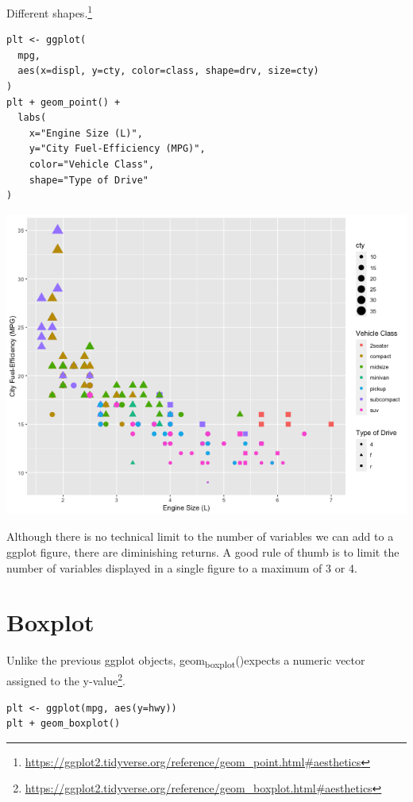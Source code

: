 \documentclass[11pt]{article}
\begin{document}
Different shapes.\footnote{\url{https://ggplot2.tidyverse.org/reference/geom\_point.html\#aesthetics}}

\begin{verbatim}
plt <- ggplot(
  mpg,
  aes(x=displ, y=cty, color=class, shape=drv, size=cty)
)
plt + geom_point() +
  labs(
    x="Engine Size (L)",
    y="City Fuel-Efficiency (MPG)",
    color="Vehicle Class",
    shape="Type of Drive"
)
\end{verbatim}

\begin{org}
\begin{center}
\includegraphics[width=.9\linewidth]{./resources/mpg_dots3.png}
\end{center}
\end{org}

Although there is no technical limit to the number of variables we can add to a ggplot figure, there are diminishing returns. A good rule of thumb is to limit the number of variables displayed in a single figure to a maximum of 3 or 4.

\section{Boxplot}
\label{sec:orgb045f23}

Unlike the previous ggplot objects, geom\textsubscript{boxplot}()expects a numeric vector assigned to the y-value\footnote{\url{https://ggplot2.tidyverse.org/reference/geom\_boxplot.html\#aesthetics}}.

\begin{verbatim}
plt <- ggplot(mpg, aes(y=hwy))
plt + geom_boxplot()
\end{verbatim}
\end{document}

